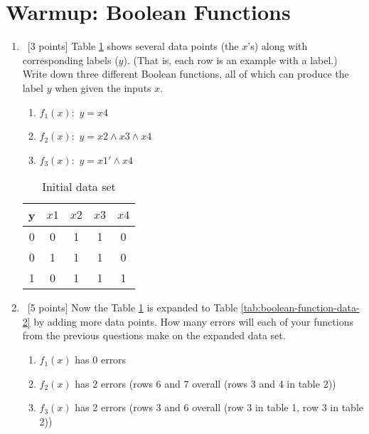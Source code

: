 \section{Warmup: Boolean Functions}
\label{sec:boolean-functions}

\begin{enumerate}
\item ~[3 points] Table \ref{tab:boolean-function-data-1} shows
  several data points (the $x$'s) along with corresponding labels
  ($y$). (That is, each row is an example with a label.) Write down
  three different Boolean functions, all of which can produce the
  label $y$ when given the inputs $x$.

  {\color{red}
    \begin{enumerate}
      \item $f_1(x): $ $y = x4$
      \item $f_2(x): $ $y = x2 \wedge x3 \wedge x4$
      \item $f_3(x): $ $y = x1' \wedge x4$
    \end{enumerate}
  }

  \begin{table}[h]
    \centering
    \begin{tabular}{ccccc}
      \toprule
      y & $x1$ & $x2$ & $x3$ & $x4$ \\
      \midrule
      0 & 0    & 1    & 1    & 0    \\
      0 & 1    & 1    & 1    & 0    \\
      1 & 0    & 1    & 1    & 1    \\
      \bottomrule
    \end{tabular}
    \caption{Initial data set}
    \label{tab:boolean-function-data-1}
  \end{table}

\item ~[5 points] Now the Table \ref{tab:boolean-function-data-1} is
  expanded to Table \ref{tab:boolean-function-data-2} by adding more
  data points. How many errors will each of your functions from the
  previous questions make on the expanded data set.

  {\color{red}
    \begin{enumerate}
      \item $f_1(x)$ has 0 errors
      \item $f_2(x)$ has 2 errors (rows 6 and 7 overall (rows 3 and 4 in table 2))
      \item $f_3(x)$ has 2 errors (rows 3 and 6 overall (row 3 in table 1, row 3 in table 2))
    \end{enumerate}
  }


\end{enumerate}

